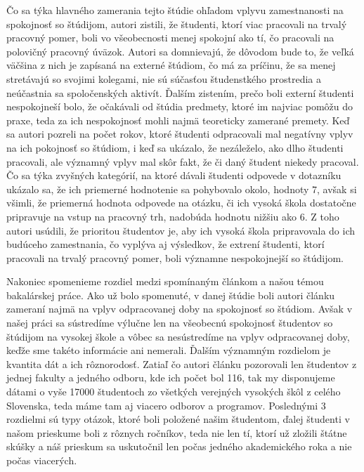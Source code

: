 Čo sa týka hlavného zamerania tejto štúdie ohľadom vplyvu zamestnanosti na spokojnosť so štúdijom, autori zistili, že študenti, ktorí viac pracovali na trvalý pracovný pomer, boli vo všeobecnosti menej spokojní ako tí, čo pracovali na polovičný pracovný úväzok. Autori sa domnievajú, že dôvodom bude to, že veľká väčšina z nich je zapísaná na externé štúdiom, čo má za príčinu, že sa menej stretávajú so svojimi kolegami, nie sú súčasťou študenstkého prostredia a neúčastnia sa spoločenských aktivít. Ďalším zistením, prečo boli externí študenti nespokojneší bolo, že očakávali od štúdia predmety, ktoré im najviac pomôžu do praxe, teda za ich nespokojnosť mohli najmä teoreticky zamerané premety. Keď sa autori pozreli na počet rokov, ktoré študenti odpracovali mal negatívny vplyv na ich pokojnosť so štúdiom, i keď sa ukázalo, že nezáleželo, ako dlho študenti pracovali, ale významný vplyv mal skôr fakt, že či daný študent niekedy pracoval. Čo sa týka zvyšných kategórií, na ktoré dávali študenti odpovede v dotazníku ukázalo sa, že ich priemerné hodnotenie sa pohybovalo okolo, hodnoty 7, avšak si všimli, že priemerná hodnota odpovede na otázku, či ich vysoká škola dostatočne pripravuje na vstup na pracovný trh, nadobúda hodnotu nižšiu ako 6. Z toho autori usúdili, že prioritou študentov je, aby ich vysoká škola pripravovala do ich budúceho zamestnania, čo vyplýva aj výsledkov, že extrení študenti, ktorí pracovali na trvalý pracovný pomer, boli významne nespokojnejší so štúdijom.  

Nakoniec spomenieme rozdiel medzi spomínaným článkom a našou témou bakalárskej práce. Ako už bolo spomenuté, v danej štúdie boli autori článku zameraní najmä na vplyv odpracovanej doby na spokojnosť so štúdiom. Avšak v našej práci sa sústredíme výlučne len na všeobecnú spokojnosť študentov so štúdijom na vysokej škole a vôbec sa nesústredíme na vplyv odpracovanej doby, keďže sme takéto informácie ani nemerali. Ďalším významným rozdielom je kvantita dát a ich rôznorodosť. Zatiaľ čo autori článku pozorovali len študentov z jednej fakulty a jedného odboru, kde ich počet bol 116, tak my disponujeme dátami o vyše 17000 študentoch zo všetkých verejných vysokých škôl z celého Slovenska, teda máme tam aj viacero odborov a programov. Poslednými 3 rozdielmi sú typy otázok, ktoré boli položené našim študentom, ďalej študenti v našom prieskume boli z rôznych ročníkov, teda nie len tí, ktorí už zložili štátne skúšky a náš prieskum sa uskutočnil len počas jedného akademického roka a nie počas viacerých. \cite{prieskum}